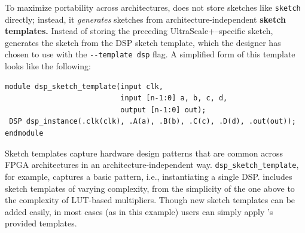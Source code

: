 To maximize portability across architectures,
  \lr does not store sketches 
  like \texttt{sketch}
  directly; 
  instead, it \textit{generates} sketches
  from architecture-independent
  \textbf{sketch templates.}
Instead of storing
  the preceding UltraScale+--specific sketch,
  \lr generates the sketch
  from the DSP sketch template, which
  the designer has chosen to use 
  with the \mbox{\texttt{-{}-template dsp}} flag.
A simplified form of this template looks like the following:
\begin{verbatim}
module dsp_sketch_template(input clk,
                           input [n-1:0] a, b, c, d,
                           output [n-1:0] out);
 DSP dsp_instance(.clk(clk), .A(a), .B(b), .C(c), .D(d), .out(out));
endmodule
\end{verbatim}
Sketch templates
  capture hardware design patterns
that are common across FPGA architectures
  in an
  architecture-independent way.
\texttt{dsp\_sketch\_template},
  for example, 
  captures
  a basic pattern, i.e., 
  instantiating a single DSP.
\lr includes 
  sketch templates of varying complexity,
  from the simplicity of the one above 
  to the complexity of LUT-based multipliers.
Though new sketch templates
  can be added easily,
  in most cases
  (as in this example)
  users can simply apply
  \lr's provided templates.

